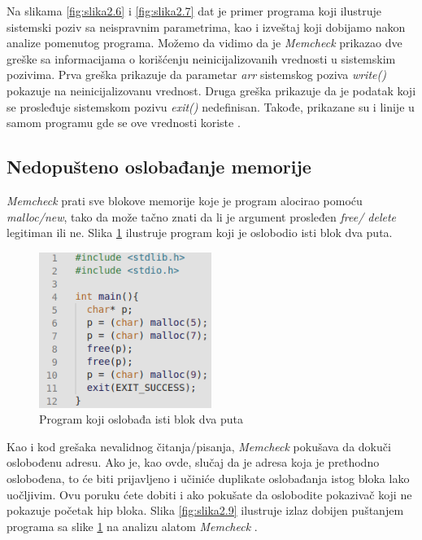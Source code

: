 \documentclass[12pt,oneside]{memoir}
\theoremstyle{plain}
\theoremstyle{definition}
\begin{document}
Na slikama \ref{fig:slika2.6} i \ref{fig:slika2.7} dat je primer programa koji ilustruje sistemski poziv sa neispravnim parametrima, kao i izveštaj koji dobijamo nakon analize pomenutog programa. Možemo da vidimo da je \textit{Memcheck} prikazao dve greške sa informacijama o korišćenju neinicijalizovanih vrednosti u sistemskim pozivima. Prva greška prikazuje da parametar \textit{arr} sistemskog poziva \textit{write()} pokazuje na neinicijalizovanu vrednost. Druga greška prikazuje da je podatak koji se prosleđuje sistemskom pozivu \textit{exit()} nedefinisan. Takođe, prikazane su i linije u samom programu gde se ove vrednosti koriste \cite{Memcheck}. 

\subsection{Nedopušteno oslobađanje memorije}
\textit{Memcheck} prati sve blokove memorije koje je program alocirao pomoću \textit{malloc/new}, tako da može tačno znati da li je argument prosleđen \textit{free/ delete} legitiman ili ne. Slika \ref{fig:slika2.8} ilustruje program koji je oslobodio isti blok dva puta. 

\begin{figure}[!ht]
  \centering
  \includegraphics[width=0.5\textwidth]{invalidFreeErrorProgram.png}
  \caption{Program koji oslobađa isti blok dva puta}
  \label{fig:slika2.8}
\end{figure}

Kao i kod grešaka nevalidnog čitanja/pisanja, \textit{Memcheck} pokušava da dokuči oslobođenu adresu. Ako je, kao ovde, slučaj da je adresa koja je prethodno oslobođena, to će biti prijavljeno i učiniće duplikate oslobađanja istog bloka lako uočljivim. Ovu poruku ćete dobiti i ako pokušate da oslobodite pokazivač koji ne pokazuje početak hip bloka. Slika \ref{fig:slika2.9} ilustruje izlaz dobijen puštanjem programa sa slike \ref{fig:slika2.8} na analizu alatom \textit{Memcheck} \cite{Memcheck}. 
\end{document}
